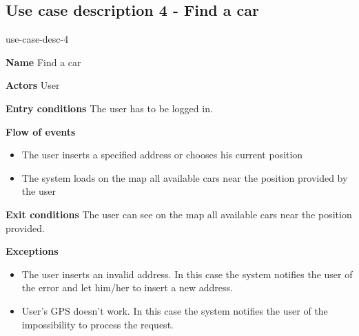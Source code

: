 \subsection{Use case description 4 - Find a car}
\begin{labeling}{use-case-desc-4}
		\item[\textbf{Name}] Find a car
		\item[\textbf{Actors}] User
		\item[\textbf{Entry conditions}] The user has to be logged in.
		\item[\textbf{Flow of events}]
			\begin{itemize}
				\item[]
				\item The user inserts a specified address or chooses his current position
				\item The system loads on the map all available cars near the position provided by the user
			\end{itemize}
		\item[\textbf{Exit conditions}] The user can see on the map all available cars near the position provided. 
		\item[\textbf{Exceptions}]
			\begin{itemize}
				\item[]
				\item The user inserts an invalid address. In this case the system notifies the user of the error and let him/her to insert a new address.
				\item User’s GPS doesn’t work. In this case the system notifies the user of the impossibility to process the request.
			\end{itemize}
	\end{labeling}
	
